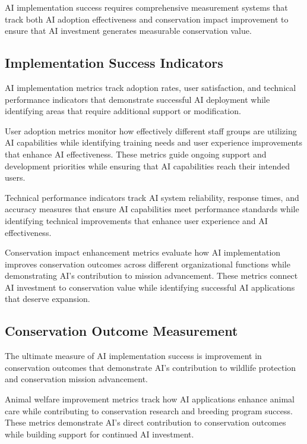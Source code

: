 \documentclass[
  Letterpaper,
]{scrbook}
\begin{document}
AI implementation success requires comprehensive measurement systems
that track both AI adoption effectiveness and conservation impact
improvement to ensure that AI investment generates measurable
conservation value.

\subsection{Implementation Success
Indicators}\label{implementation-success-indicators}

AI implementation metrics track adoption rates, user satisfaction, and
technical performance indicators that demonstrate successful AI
deployment while identifying areas that require additional support or
modification.

User adoption metrics monitor how effectively different staff groups are
utilizing AI capabilities while identifying training needs and user
experience improvements that enhance AI effectiveness. These metrics
guide ongoing support and development priorities while ensuring that AI
capabilities reach their intended users.

Technical performance indicators track AI system reliability, response
times, and accuracy measures that ensure AI capabilities meet
performance standards while identifying technical improvements that
enhance user experience and AI effectiveness.

Conservation impact enhancement metrics evaluate how AI implementation
improves conservation outcomes across different organizational functions
while demonstrating AI's contribution to mission advancement. These
metrics connect AI investment to conservation value while identifying
successful AI applications that deserve expansion.

\subsection{Conservation Outcome
Measurement}\label{conservation-outcome-measurement}

The ultimate measure of AI implementation success is improvement in
conservation outcomes that demonstrate AI's contribution to wildlife
protection and conservation mission advancement.

Animal welfare improvement metrics track how AI applications enhance
animal care while contributing to conservation research and breeding
program success. These metrics demonstrate AI's direct contribution to
conservation outcomes while building support for continued AI
investment.
\end{document}
